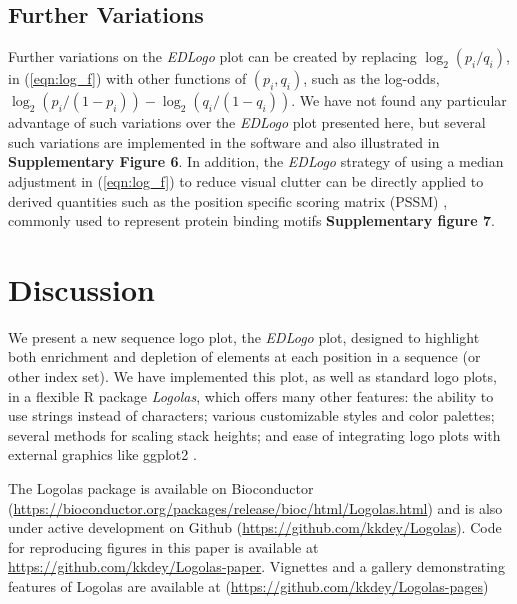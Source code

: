 \documentclass{bmcart}
\begin{document}

\subsection*{Further Variations}

Further variations on the \textit{EDLogo} plot can 
be created by replacing 
$\log_2(p_i/q_i)$, in (\ref{eqn:log_f}) with other functions of $(p_i,q_i)$, such as the log-odds, $\log_2(p_i/(1-p_i)) - \log_2(q_i/(1-q_i))$.
We have not found any particular advantage of such variations over the \textit{EDLogo} plot presented here,
but several such variations are implemented in the software and also 
illustrated in \textbf{Supplementary Figure 6}. In addition,
the \textit{EDLogo} strategy 
of using a median adjustment in (\ref{eqn:log_f}) 
to reduce visual clutter can be directly applied to derived quantities
such as the position specific scoring matrix (PSSM) \cite{Shameer2009, Joseph2014},
commonly used to represent protein binding motifs \textbf{Supplementary figure 7}. 




 

\section*{Discussion}

We present a new sequence logo plot, the \textit{EDLogo} plot, designed to highlight both 
enrichment and depletion of elements at each position in a sequence (or other index set).  
We have implemented this plot, as well as standard logo plots, in a flexible R package \textit{Logolas},
which offers many other features: the ability to use strings instead of characters;
various customizable styles and color palettes; several methods for scaling stack heights; and ease of integrating logo plots with external graphics like ggplot2 \cite{ggplot2}.  

The Logolas package is available on Bioconductor (\url{https://bioconductor.org/packages/release/bioc/html/Logolas.html}) and is also under active development on Github (\url{https://github.com/kkdey/Logolas}). Code for reproducing figures in this paper is available at \url{https://github.com/kkdey/Logolas-paper}. Vignettes and a gallery demonstrating features of Logolas are available at (\url{https://github.com/kkdey/Logolas-pages})
\end{document}
